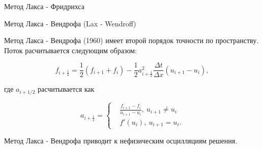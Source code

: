 \documentclass[10pt,xcolor=pst,aspectratio=169]{beamer}
\begin{document}
\begin{frame}{Метод Лакса - Фридрихса}
\end{frame}

%
%
%

\begin{frame}{Метод Лакса - Вендрофа (Lax - Wendroff)}

	\transdissolve[duration=0.1]
	\justifying
	\large

	Метод Лакса - Вендрофа (1960) имеет второй порядок точности по пространству. Поток расчитывается следующим образом:

	\[
		f_{i + \frac{1}{2}} = \frac{1}{2} \left( f_{i + 1} + f_{i} \right) - 
		\frac{1}{2} a_{i + \frac{1}{2}}^{2} \frac{\Delta t}{\Delta x} \left( u_{i + 1} - u_{i} \right),
	\]

	где $a_{i + 1/2}$ расчитывается как

	\[
		a_{i + \frac{1}{2}} =
		\begin{cases}
			&\frac{f_{i + 1} - f_{i}}{u_{i + 1} - u_{i}}, \: u_{i + 1} \neq u_{i} \\
			&f'(u_{i}), \: u_{i + 1} = u_{i}.
		\end{cases}
	\]
	
	Метод Лакса - Вендрофа приводит к нефизическим осцилляциям решения.

\end{frame}

%
%
%
%
%
%
%
\end{document}
